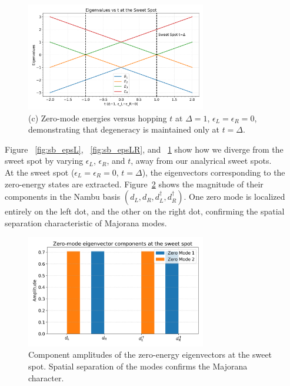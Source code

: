 \documentclass[11pt, letterpaper, titlepage]{article}
\begin{document}
\begin{figure}[htbp]
  \centering
  \includegraphics[width=0.7\textwidth]{../Figures/singlebody_sweetspot_t.png}
  \caption{(c) Zero-mode energies versus hopping $t$ at $\Delta = 1$, $\epsilon_L = \epsilon_R = 0$, demonstrating that degeneracy is maintained only at $t = \Delta$.}
  \label{fig:sb_tscan}
\end{figure}
\newpage
Figure ~\ref{fig:sb_epsL}, ~\ref{fig:sb_epsLR}, and ~\ref{fig:sb_tscan} show how we diverge from the sweet spot by varying $\epsilon_L$, $\epsilon_R$, and $t$, away from our analyrical sweet spots.\\
At the sweet spot ($\epsilon_L = \epsilon_R = 0$, $t = \Delta$), the eigenvectors corresponding to the zero-energy states are extracted. Figure~\ref{fig:sb_zero_modes} shows the magnitude of their components in the Nambu basis $(d_L, d_R, d_L^\dagger, d_R^\dagger)$. One zero mode is localized entirely on the left dot, and the other on the right dot, confirming the spatial separation characteristic of Majorana modes.

\begin{figure}[htbp]
  \centering
  \includegraphics[width=0.7\textwidth]{../Figures/singlebody_sweetspot_zero_modes.png}
  \caption{Component amplitudes of the zero-energy eigenvectors at the sweet spot. Spatial separation of the modes confirms the Majorana character.}
  \label{fig:sb_zero_modes}
\end{figure}
\end{document}
